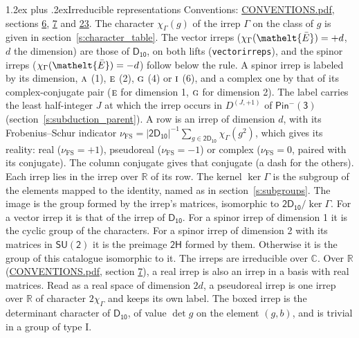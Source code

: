 \documentclass[10pt,a4paper]{article}
\makeatletter
\renewcommand\section{\@startsection{section}{1}{\z@}{-3ex plus -1ex minus -.2ex}%
  {1.2ex plus .2ex}{\normalfont\large\sffamily\bfseries\color{parttitle}}}
\numberwithin{equation}{section}
\newcommand{\eltfont}[1]{{\let\sigma\eltsigma\mathelt{#1}}}
\newcommand{\grp}[1]{\mathsf{#1}}
\newcommand{\irr}[1]{\text{\normalfont\scshape #1}}
\newcommand{\elt}[1]{\eltfont{#1}}
\newcommand{\irrJp}[2]{D^{(#1,#2)}}
\newcommand{\irchar}[1]{\chi_{#1}}
\newcommand{\fsind}{\nu_{\mathrm{FS}}}
\newcommand{\barred}[1]{\bar{#1}}
\makeatother
\begin{document}
\section{Irreducible representations}\label{s:irreps}
Conventions: \href{../../CONVENTIONS.pdf}{CONVENTIONS.pdf}, sections \href{../../../rotation/CONVENTIONS.pdf\#conv.6}{6}, \href{../../../rotation/CONVENTIONS.pdf\#conv.7}{7} and \href{../../CONVENTIONS.pdf\#conv.23}{23}.
\leavevmode\label{n:function.character}\label{n:irrep.Gamma}The character $\irchar{\Gamma}(g)$ of the irrep $\Gamma$ on the class of $g$ is given in section~\ref{s:character_table}. \label{n:index.dimension}The vector irreps ($\irchar{\Gamma}(\elt{\barred{E}}) = +d$, $d$ the dimension) are those of \href{../../../rotation/data/pdf/D10.pdf}{$\grp{D_{10}}$}, on both lifts (\texttt{vectorirreps}), and the spinor irreps ($\irchar{\Gamma}(\elt{\barred{E}}) = -d$) follow below the rule. A spinor irrep is labeled by its dimension, $\irr{a}$ (1), $\irr{e}$ (2), $\irr{g}$ (4) or $\irr{i}$ (6), and a complex one by that of its complex-conjugate pair ($\irr{e}$ for dimension 1, $\irr{g}$ for dimension 2). The label carries the least half-integer $J$ at which the irrep occurs in $\irrJp{J}{+1}$ of $\grp{Pin^{-}(3)}$ (section~\ref{s:subduction_parent}).
\leavevmode\label{n:index.frobenius}\label{n:head.irrep}\label{n:head.reality}A row is an irrep of dimension $d$, with its Frobenius--Schur indicator $\fsind = |\grp{2D_{10}}|^{-1}\allowbreak\sum_{g\in\grp{2D_{10}}}\irchar{\Gamma}(g^2)$, which gives its reality: real ($\fsind = +1$), pseudoreal ($\fsind = -1$) or complex ($\fsind = 0$, paired with its conjugate). \label{n:head.conjugate}The column conjugate gives that conjugate (a dash for the others). \label{n:head.over.real}Each irrep lies in the irrep over $\mathbb{R}$ of its row. \label{n:head.kernel}The kernel $\ker\Gamma$ is the subgroup of the elements mapped to the identity, named as in section~\ref{s:subgroups}. \label{n:head.image}The image is the group formed by the irrep's matrices, isomorphic to $\grp{2D_{10}}/\ker\Gamma$. For a vector irrep it is that of the irrep of \href{../../../rotation/data/pdf/D10.pdf}{$\grp{D_{10}}$}. For a spinor irrep of dimension 1 it is the cyclic group of the characters. For a spinor irrep of dimension 2 with its matrices in $\grp{SU(2)}$ it is the preimage $\grp{2H}$ formed by them. Otherwise it is the group of this catalogue isomorphic to it. The irreps are irreducible over $\mathbb{C}$. Over $\mathbb{R}$ (\href{../../CONVENTIONS.pdf}{CONVENTIONS.pdf}, section \href{../../../rotation/CONVENTIONS.pdf\#conv.7}{7}), a real irrep is also an irrep in a basis with real matrices. Read as a real space of dimension $2d$, a pseudoreal irrep is one irrep over $\mathbb{R}$ of character $2\irchar{\Gamma}$ and keeps its own label. \label{n:mark.determinant}The boxed irrep is the determinant character of \href{../../../rotation/data/pdf/D10.pdf}{$\grp{D_{10}}$}, of value $\det g$ on the element $(g, b)$, and is trivial in a group of type I.
\end{document}
